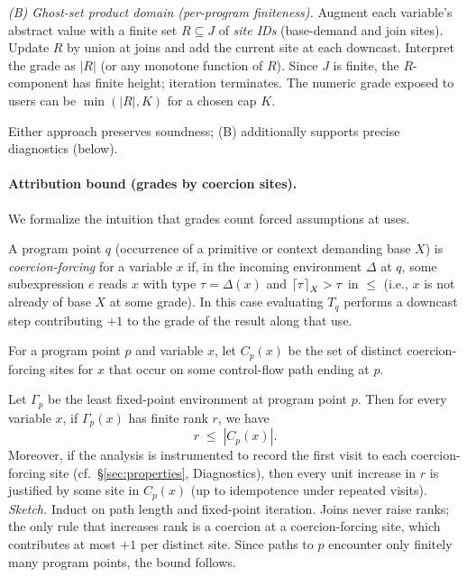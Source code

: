 \smallskip
\noindent\emph{(B) Ghost-set product domain (per-program finiteness).}
Augment each variable’s abstract value with a finite set $R\subseteq J$ of \emph{site IDs} (base-demand and join sites).
Update $R$ by union at joins and add the current site at each downcast.
Interpret the grade as $|R|$ (or any monotone function of $R$).
Since $J$ is finite, the $R$-component has finite height; iteration terminates.
The numeric grade exposed to users can be $\min(|R|,K)$ for a chosen cap $K$.

\smallskip
Either approach preserves soundness; (B) additionally supports precise diagnostics (below).

\paragraph{Attribution bound (grades by coercion sites).}
We formalize the intuition that grades count forced assumptions at uses.

\begin{definition}
A program point $q$ (occurrence of a primitive or context demanding base $X$) is \emph{coercion-forcing} for a variable $x$ if, in the incoming environment $\Delta$ at $q$, some subexpression $e$ reads $x$ with type $\tau=\Delta(x)$ and $\left\lceil \tau \right\rceil_X > \tau$ in $\le$ (i.e., $x$ is not already of base $X$ at some grade).
In this case evaluating $T_q$ performs a downcast step contributing $+1$ to the grade of the result along that use.
\end{definition}

\begin{definition}
For a program point $p$ and variable $x$, let $C_p(x)$ be the set of distinct coercion-forcing sites for $x$ that occur on some control-flow path ending at $p$.
\end{definition}

\begin{theorem}
\label{thm:attribution}
Let $\Gamma_p$ be the least fixed-point environment at program point $p$.
Then for every variable $x$, if $\Gamma_p(x)$ has finite rank $r$, we have
\[
r \;\le\; |C_p(x)|.
\]
Moreover, if the analysis is instrumented to record the first visit to each coercion-forcing site (cf.\ §\ref{sec:properties}, Diagnostics), then every unit increase in $r$ is justified by some site in $C_p(x)$ (up to idempotence under repeated visits).
\emph{Sketch.} Induct on path length and fixed-point iteration.
Joins never raise ranks; the only rule that increases rank is a coercion at a coercion-forcing site, which contributes at most $+1$ per distinct site.
Since paths to $p$ encounter only finitely many program points, the bound follows.
\end{theorem}

